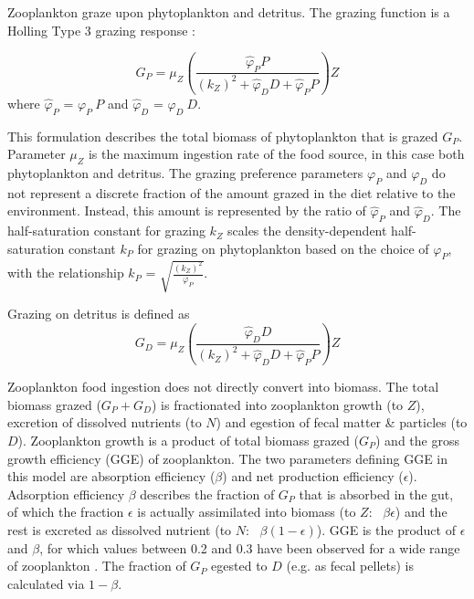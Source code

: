 \documentclass[journal abbreviation, manuscript]{copernicus}
\begin{document}
Zooplankton graze upon phytoplankton and detritus. The grazing function is a Holling Type 3 grazing response \citep{Anderson2015c}:

\begin{equation}
    G_P = \mu_Z \left( \frac{ \hat{\varphi}_P P}{(k_Z)^2 + \hat{\varphi}_D D +\hat{\varphi}_P P}  \right) Z
\end{equation}
where $\hat{\varphi}_P$ = $\varphi_P \ P$ and $\hat{\varphi}_D$ = $\varphi_D \ D$.

This formulation describes the total biomass of phytoplankton that is grazed $G_P$. Parameter $\mu_Z$ is the maximum ingestion rate of the food source, in this case both phytoplankton and detritus. The grazing preference parameters $\varphi_P$ and $\varphi_D$ do not represent a discrete fraction of the amount grazed in the diet relative to the environment. Instead, this amount is represented by the ratio of $\hat{\varphi}_P$ and $\hat{\varphi}_D$. 
The half-saturation constant for grazing $k_Z$ scales the density-dependent half-saturation constant $k_P$ for grazing on phytoplankton based on the choice of $\varphi_P$, with the relationship $k_P$ = $\sqrt{\frac{(k_Z)^2 }{\varphi_P}}$.

Grazing on detritus is defined as
\begin{equation}
    G_D = \mu_Z \left( \frac{ \hat{\varphi}_D D}{(k_Z)^2 + \hat{\varphi}_D D +\hat{\varphi}_P P}  \right) Z
\end{equation}

Zooplankton food ingestion does not directly convert into biomass. The total biomass grazed ($G_P + G_D$) is fractionated into zooplankton growth (to $Z$), excretion of dissolved nutrients (to $N$) and egestion of fecal matter \& particles (to $D$). Zooplankton growth is a product of total biomass grazed ($G_P$) and the gross growth efficiency (GGE) of zooplankton. The two parameters defining GGE in this model are absorption efficiency ($\beta$) and net production efficiency ($\epsilon$). Adsorption efficiency $\beta$ describes the fraction of $G_P$ that is absorbed in the gut, of which the fraction $\epsilon$ is actually assimilated into biomass (to $Z$: \ $\beta \epsilon$) and the rest is excreted as dissolved nutrient (to $N$: \ $\beta (1-\epsilon)$). GGE is the product of $\epsilon$ and $\beta$, for which values between 0.2 and 0.3 have been observed for a wide range of zooplankton \citep{Straile1997GrossGroup}. The fraction of $G_P$ egested to $D$ (e.g. as fecal pellets) is calculated via $1-\beta$. 
\end{document}
